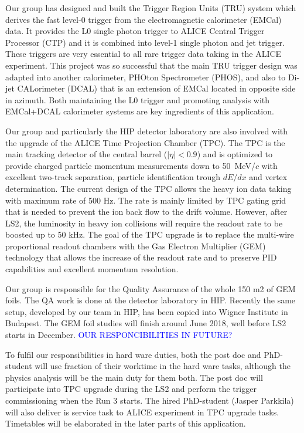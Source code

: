 Our group has designed and built the Trigger Region Units (TRU) system which derives the fast level-0 trigger from the electromagnetic calorimeter (EMCal) data. It provides the L0 single photon trigger to ALICE Central Trigger Processor (CTP) and it is combined into level-1 single photon and jet trigger. 
These triggers are very essential to all rare trigger data taking in the ALICE experiment. This project was so successful that the main TRU trigger design was adapted into another calorimeter, PHOton Spectrometer (PHOS), and also to Di-jet CALorimeter (DCAL) that is an extension of EMCal located in opposite side in azimuth. Both maintaining the L0 trigger and promoting analysis with EMCal+DCAL calorimeter systems are key ingredients of this application.

Our group and particularly the HIP detector laboratory are also involved with the upgrade of the ALICE Time Projection Chamber (TPC). The TPC is the main tracking detector of the central barrel ($|\eta|<0.9$) and is optimized to provide charged particle momentum measurements down to 50~MeV/$c$ with excellent two-track separation, particle identification trough $dE/dx$ and vertex determination. The current design of the TPC allows the heavy ion data taking with maximum rate of 500 Hz. The rate is mainly limited by TPC gating grid that is needed to prevent the ion back flow to the drift volume. 
However, after LS2, the luminosity in heavy ion collisions will require the readout rate to be boosted up to 50 kHz. 
The goal of the TPC upgrade is to replace the multi-wire proportional readout chambers with the Gas Electron Multiplier (GEM) technology that allows the increase of the readout rate and to preserve PID capabilities and excellent momentum resolution.

Our group is responsible for the Quality Assurance of the whole 150 m2 of GEM foils. The QA work is done at the detector laboratory in HIP. Recently the same setup, developed by our team in HIP, has been copied into Wigner Institute in Budapest. The GEM foil studies will finish around June 2018, well before LS2 starts in December. \textcolor{blue}{OUR RESPONCIBILITIES IN FUTURE?}

To fulfil our responsibilities in hard ware duties, both the post doc and PhD-student will use fraction of their worktime in the hard ware tasks, although the physics analysis will be the main duty for them both. The post doc will participate into TPC upgrade during the LS2 and perform the trigger commissioning when the Run 3 starts. The hired PhD-student (Jasper Parkkila) will also deliver is service task to ALICE experiment in TPC upgrade tasks. Timetables will be elaborated in the later parts of this application.


